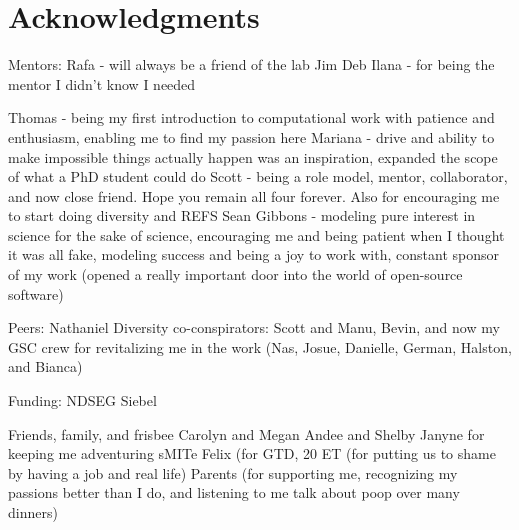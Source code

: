 \cleardoublepage
\setcounter{savepage}{\thepage}
\begin{abstractpage}

\end{abstractpage}

\cleardoublepage

\section*{Acknowledgments}

Mentors:
Rafa - will always be a friend of the lab
Jim
Deb
Ilana - for being the mentor I didn't know I needed

Thomas - being my first introduction to computational work with patience and enthusiasm, enabling me to find my passion here
Mariana - drive and ability to make impossible things actually happen was an inspiration, expanded the scope of what a PhD student could do
Scott - being a role model, mentor, collaborator, and now close friend. Hope you remain all four forever. Also for encouraging me to start doing diversity and REFS
Sean Gibbons - modeling pure interest in science for the sake of science, encouraging me and being patient when I thought it was all fake, modeling success and being a joy to work with, constant sponsor of my work (opened a really important door into the world of open-source software)

Peers:
Nathaniel
Diversity co-conspirators: Scott and Manu, Bevin, and now my GSC crew for revitalizing me in the work (Nas, Josue, Danielle, German, Halston, and Bianca)

Funding:
NDSEG
Siebel

Friends, family, and frisbee
Carolyn and Megan
Andee and Shelby
Janyne for keeping me adventuring
sMITe
Felix (for GTD, 20%
ET (for putting us to shame by having a job and real life)
Parents (for supporting me, recognizing my passions better than I do, and listening to me talk about poop over many dinners)
